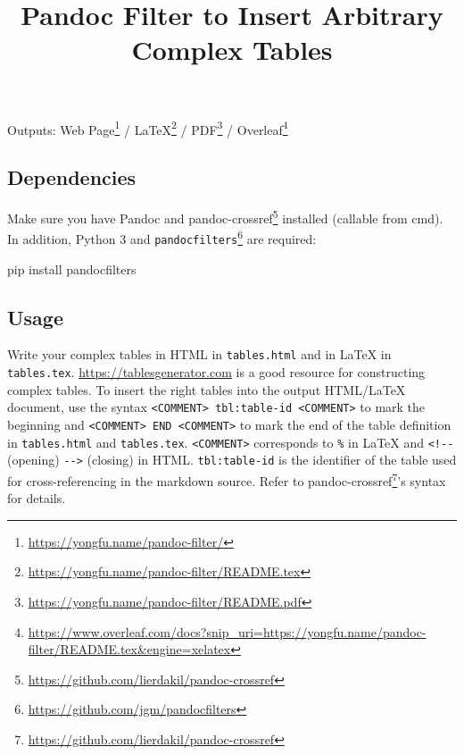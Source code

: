 \documentclass[
]{article}
\title{Pandoc Filter to Insert Arbitrary Complex Tables}
\author{}
\date{}
\newenvironment{Shaded}{}{}
\newcommand{\ExtensionTok}[1]{#1}
\newcommand{\NormalTok}[1]{#1}
\DeclareRobustCommand{\href}[2]{#2\footnote{\url{#1}}}
\begin{document}
\maketitle

Outputs: \href{https://yongfu.name/pandoc-filter/}{Web Page} /
\href{https://yongfu.name/pandoc-filter/README.tex}{LaTeX} /
\href{https://yongfu.name/pandoc-filter/README.pdf}{PDF} /
\href{https://www.overleaf.com/docs?snip_uri=https://yongfu.name/pandoc-filter/README.tex\&engine=xelatex}{Overleaf}

\hypertarget{dependencies}{%
\subsection{Dependencies}\label{dependencies}}

Make sure you have Pandoc and
\href{https://github.com/lierdakil/pandoc-crossref}{pandoc-crossref}
installed (callable from cmd). In addition, Python 3 and
\href{https://github.com/jgm/pandocfilters}{\texttt{pandocfilters}} are
required:

\begin{Shaded}
\begin{Highlighting}[]
\ExtensionTok{pip}\NormalTok{ install pandocfilters}
\end{Highlighting}
\end{Shaded}

\hypertarget{usage}{%
\subsection{Usage}\label{usage}}

Write your complex tables in HTML in \texttt{tables.html} and in LaTeX
in \texttt{tables.tex}. \url{https://tablesgenerator.com} is a good
resource for constructing complex tables. To insert the right tables
into the output HTML/LaTeX document, use the syntax
\texttt{\textless{}COMMENT\textgreater{}\ tbl:table-id\ \textless{}COMMENT\textgreater{}}
to mark the beginning and
\texttt{\textless{}COMMENT\textgreater{}\ END\ \textless{}COMMENT\textgreater{}}
to mark the end of the table definition in \texttt{tables.html} and
\texttt{tables.tex}. \texttt{\textless{}COMMENT\textgreater{}}
corresponds to \texttt{\%} in LaTeX and \texttt{\textless{}!-\/-}
(opening) \texttt{-\/-\textgreater{}} (closing) in HTML.
\texttt{tbl:table-id} is the identifier of the table used for
cross-referencing in the markdown source. Refer to
\href{https://github.com/lierdakil/pandoc-crossref}{pandoc-crossref}'s
syntax for details.
\end{document}
